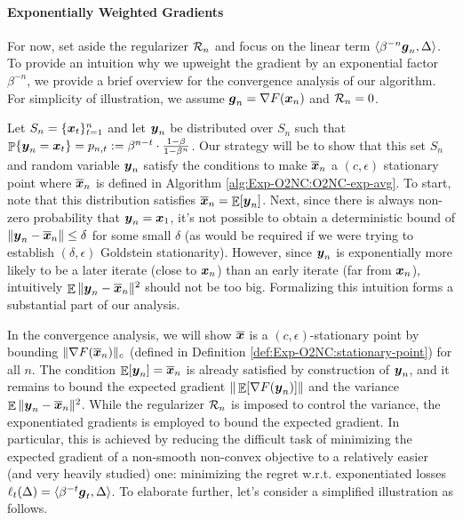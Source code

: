 \paragraph{Exponentially Weighted Gradients}
For now, set aside the regularizer ${\cal R}_n$ and focus on the linear term $\langle\beta^{-n}{\boldsymbol{g}}_n,\Delta\rangle$. To provide an intuition why we upweight the gradient by an exponential factor $\beta^{-n}$, we provide a brief overview for the convergence analysis of our algorithm. For simplicity of illustration, we assume ${\boldsymbol{g}}_n = \nabla F({\boldsymbol{x}}_n)$ and ${\cal R}_n=0$.

Let $S_n=\{{\boldsymbol{x}}_t\}_{t=1}^n$ and let ${\boldsymbol{y}}_n$ be distributed over $S_n$ such that $\mathop{\mathbb{P}}\{{\boldsymbol{y}}_n={\boldsymbol{x}}_t\} = p_{n,t} := \beta^{n-t}\cdot \frac{1-\beta}{1-\beta^n}$. Our strategy will be to show that this set $S_n$ and random variable ${\boldsymbol{y}}_n$ satisfy the conditions to make $\overline {{\boldsymbol{x}}}_n$ a $(c,\epsilon)$ stationary point  where $\overline{{\boldsymbol{x}}}_n$ is defined in Algorithm \ref{alg:Exp-O2NC:O2NC-exp-avg}. To start, note that this distribution satisfies $\overline{{\boldsymbol{x}}}_n=\mathop{\mathbb{E}}[{\boldsymbol{y}}_n]$. Next, since there is always non-zero probability that ${\boldsymbol{y}}_n={\boldsymbol{x}}_1$, it's not possible to obtain a deterministic bound of $\|{\boldsymbol{y}}_n-\overline{{\boldsymbol{x}}}_n\|\le \delta$ for some small $\delta$ (as would be required if we were trying to establish $(\delta,\epsilon)$ Goldstein stationarity). However, since ${\boldsymbol{y}}_n$ is exponentially more likely to be a later iterate (close to ${\boldsymbol{x}}_n$) than an early iterate (far from ${\boldsymbol{x}}_n$), intuitively $\mathop{\mathbb{E}}\|{\boldsymbol{y}}_n-\overline{{\boldsymbol{x}}}_n\|^2$ should not be too big. Formalizing this intuition forms a substantial part of our analysis.


In the convergence analysis, we will show $\overline{{\boldsymbol{x}}}$ is a $(c,\epsilon)$-stationary point by bounding $\|\nabla F(\overline{{\boldsymbol{x}}}_n)\|_c$ (defined in Definition \ref{def:Exp-O2NC:stationary-point}) for all $n$. The condition $\mathop{\mathbb{E}}[{\boldsymbol{y}}_n]=\overline{{\boldsymbol{x}}}_n$ is already satisfied by construction of ${\boldsymbol{y}}_n$, and it remains to bound the expected gradient $\|\mathop{\mathbb{E}}[\nabla F({\boldsymbol{y}}_n)]\|$ and the variance $\mathop{\mathbb{E}}\|{\boldsymbol{y}}_n-\overline{{\boldsymbol{x}}}_n\|^2$. While the regularizer ${\cal R}_n$ is imposed to control the variance, the exponentiated gradients is employed to bound the expected gradient. 
In particular, this is achieved by reducing the difficult task of minimizing the expected gradient of a non-smooth non-convex objective to a relatively easier (and very heavily studied) one: minimizing the regret w.r.t. exponentiated losses $\ell_t(\Delta) = \langle \beta^{-t}{\boldsymbol{g}}_t,\Delta\rangle$.
To elaborate further, let's consider a simplified illustration as follows.


